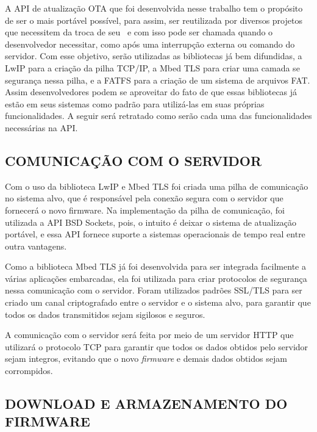 A API de atualização OTA que foi desenvolvida nesse trabalho tem o propósito de ser o mais portável possível, para assim, ser reutilizada por diversos projetos que necessitem da troca de seu \software\ e com isso pode ser chamada quando o desenvolvedor necessitar, como após uma interrupção externa ou comando do servidor. Com esse objetivo, serão utilizadas as bibliotecas já bem difundidas, a LwIP para a criação da pilha TCP/IP, a Mbed TLS para criar uma camada se segurança nessa pilha, e a FATFS para a criação de um sistema de arquivos FAT. Assim desenvolvedores podem se aproveitar do fato de que essas bibliotecas já estão em seus sistemas como padrão para utilizá-las em suas próprias funcionalidades. 
A seguir será retratado como serão cada uma das funcionalidades necessárias na API.

\subsection{COMUNICAÇÃO COM O SERVIDOR}

Com o uso da biblioteca LwIP e Mbed TLS foi criada uma pilha de comunicação no sistema alvo, que é responsável pela conexão segura com o servidor que fornecerá o novo firmware. Na implementação da pilha de comunicação, foi utilizada a API BSD Sockets, pois, o intuito é deixar o sistema de atualização portável, e essa API fornece suporte a sistemas operacionais de tempo real entre outra vantagens.

Como a biblioteca Mbed TLS já foi desenvolvida para ser integrada facilmente a várias aplicações embarcadas, ela foi utilizada para criar protocolos de segurança nessa comunicação com o servidor. Foram utilizados padrões SSL/TLS para ser criado um canal criptografado entre o servidor e o sistema alvo, para garantir que todos os dados transmitidos sejam sigilosos e seguros.

A comunicação com o servidor será feita por meio de um servidor HTTP que utilizará o protocolo TCP para garantir que todos os dados obtidos pelo servidor sejam integros, evitando que o novo \textit{firmware} e demais dados obtidos sejam corrompidos. 


\subsection{DOWNLOAD E ARMAZENAMENTO DO FIRMWARE}

